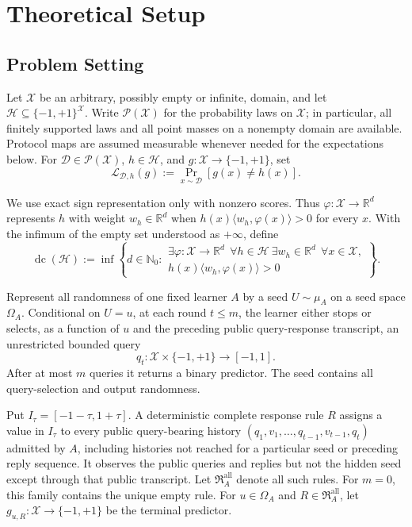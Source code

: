\section{Theoretical Setup}

\subsection{Problem Setting}

Let \(\mathcal X\) be an arbitrary, possibly empty or infinite, domain, and
let \(\mathcal H\subseteq\{-1,+1\}^{\mathcal X}\).  Write
\(\mathcal P(\mathcal X)\) for the probability laws on \(\mathcal X\); in
particular, all finitely supported laws and all point masses on a nonempty
domain are available.  Protocol maps are assumed measurable whenever needed
for the expectations below.  For \(\mathcal D\in\mathcal P(\mathcal X)\),
\(h\in\mathcal H\), and \(g:\mathcal X\to\{-1,+1\}\), set
\[
\mathcal L_{\mathcal D,h}(g)
:=\Pr_{x\sim\mathcal D}[g(x)\ne h(x)].
\]

We use exact sign representation only with nonzero scores.  Thus
\(\varphi:\mathcal X\to\mathbb R^d\) represents \(h\) with weight
\(w_h\in\mathbb R^d\) when
\(h(x)\langle w_h,\varphi(x)\rangle>0\) for every \(x\).  With the infimum
of the empty set understood as \(+\infty\), define
\[
\operatorname{dc}(\mathcal H)
:=\inf\!\left\{d\in\mathbb N_0:
\begin{array}{l}
\exists\varphi:\mathcal X\to\mathbb R^d\ \ \forall h\in\mathcal H\ 
\exists w_h\in\mathbb R^d\ \ \forall x\in\mathcal X,\\[-2pt]
h(x)\langle w_h,\varphi(x)\rangle>0
\end{array}\right\}.
\]

Represent all randomness of one fixed learner \(A\) by a seed
\(U\sim\mu_A\) on a seed space \(\Omega_A\).  Conditional on \(U=u\), at
each round \(t\le m\), the learner either stops or selects, as a function of
\(u\) and the preceding public query-response transcript, an unrestricted
bounded query
\[
q_t:\mathcal X\times\{-1,+1\}\to[-1,1].
\]
After at most \(m\) queries it returns a binary predictor.  The seed contains
all query-selection and output randomness.

Put \(I_\tau=[-1-\tau,1+\tau]\).  A deterministic complete response rule
\(R\) assigns a value in \(I_\tau\) to every public query-bearing history
\((q_1,v_1,\ldots,q_{t-1},v_{t-1},q_t)\) admitted by \(A\), including
histories not reached for a particular seed or preceding reply sequence.  It
observes the public queries and replies but not the hidden seed except through
that public transcript.  Let \(\mathfrak R_A^{\mathrm{all}}\) denote all such
rules.  For \(m=0\), this family contains the unique empty rule.  For
\(u\in\Omega_A\) and \(R\in\mathfrak R_A^{\mathrm{all}}\), let
\(g_{u,R}:\mathcal X\to\{-1,+1\}\) be the terminal predictor.

